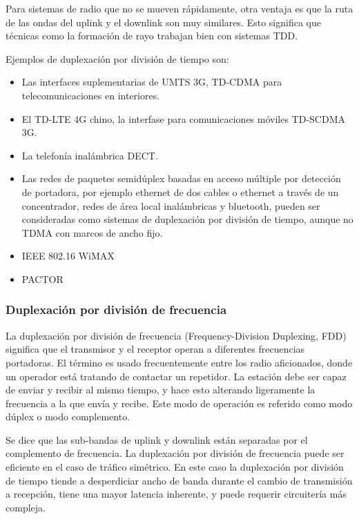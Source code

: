 \documentclass[a4paper]{article}
\begin{document}
	Para sistemas de radio que no se mueven rápidamente, otra ventaja es que la ruta de las ondas del uplink y el downlink son muy similares. Esto significa que técnicas como la formación de rayo trabajan bien con sistemas TDD.
	
	Ejemplos de duplexación por división de tiempo son:
	
	\begin{itemize}
		\item Las interfaces suplementarias de UMTS 3G, TD-CDMA para telecomunicaciones en interiores.
		\item El TD-LTE 4G chino, la interfase para comunicaciones móviles TD-SCDMA 3G.
		\item La telefonía inalámbrica DECT.
		\item Las redes de paquetes semidúplex basadas en acceso múltiple por detección de portadora, por ejemplo ethernet de dos cables o ethernet a través de un concentrador, redes de área local inalámbricas y bluetooth, pueden ser consideradas como sistemas de duplexación por división de tiempo, aunque no TDMA con marcos de ancho fijo.
		\item IEEE 802.16 WiMAX
		\item PACTOR
	\end{itemize}
	
	\subsubsection{Duplexación por división de frecuencia}
	
	La duplexación por división de frecuencia (Frequency-Division Duplexing, FDD) significa que el transmisor y el receptor operan a diferentes frecuencias portadoras. El término es usado frecuentemente entre los radio aficionados, donde un operador está tratando de contactar un repetidor. La estación debe ser capaz de enviar y recibir al mismo tiempo, y hace esto alterando ligeramente la frecuencia a la que envía y recibe. Este modo de operación es referido como modo dúplex o modo complemento.
	
	Se dice que las sub-bandas de uplink y downlink están separadas por el complemento de frecuencia. La duplexación por división de frecuencia puede ser eficiente en el caso de tráfico simétrico. En este caso la duplexación por división de tiempo tiende a desperdiciar ancho de banda durante el cambio de transmisión a recepción, tiene una mayor latencia inherente, y puede requerir circuitería más compleja.
	
\end{document}
